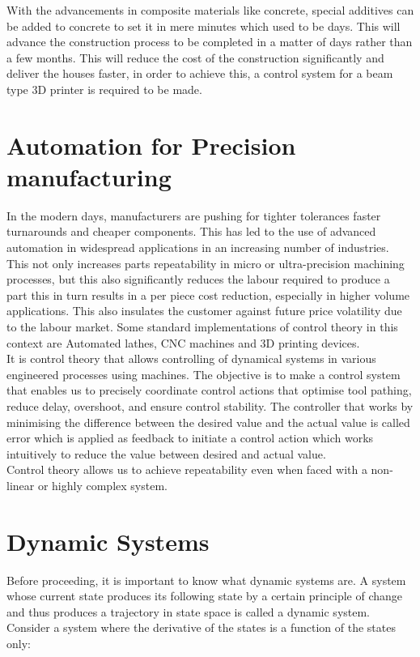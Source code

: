 \documentclass{UoNMCHA}
\numberwithin{equation}{section}
\begin{document}
	With the advancements in composite materials like concrete, special additives can be added to concrete to set it in mere minutes which used to be days. This will advance the construction process to be completed in a matter of days rather than a few months. This will reduce the cost of the construction significantly and deliver the houses faster, in order to achieve this, a control system for a beam type 3D printer is required to be made.
	
	
	\section{Automation for Precision manufacturing}\label{Automation for Precision manufacturing}
	
	In the modern days, manufacturers are pushing for tighter tolerances faster turnarounds and cheaper components. This has led to the use of advanced automation in widespread applications in an increasing number of industries. This not only increases parts repeatability in micro or ultra-precision machining processes, but this also significantly reduces the labour required to produce a part this in turn results in a per piece cost reduction, especially in higher volume applications. This also insulates the customer against future price volatility due to the labour market. Some standard implementations of control theory in this context are Automated lathes, CNC machines and 3D printing devices. \\
	It is control theory that allows controlling of dynamical systems in various engineered processes using machines. The objective is to make a control system that enables us to precisely coordinate control actions that optimise tool pathing, reduce delay, overshoot, and ensure control stability. The controller that works by minimising the difference between the desired value and the actual value is called error which is applied as feedback to initiate a control action which works intuitively to reduce the value between desired and actual value. \\
	Control theory allows us to achieve repeatability even when faced with a non-linear or highly complex system. 
	
	
	\section{Dynamic Systems}\label{Dynamic Systems}
	
	Before proceeding, it is important to know what dynamic systems are. A system whose current state produces its following state by a certain principle of change and thus produces a trajectory in state space is called a dynamic system. Consider a system where the derivative of the states is a function of the states only:
	
\end{document}
